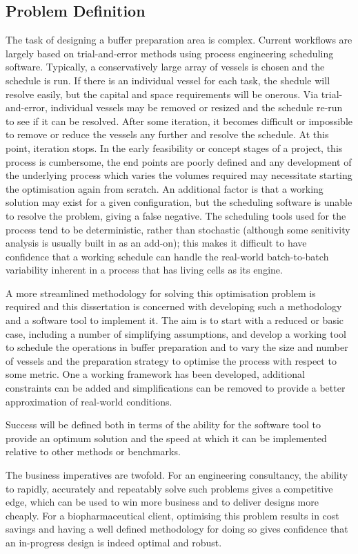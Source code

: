 \subsection{Problem Definition}\label{SS.probdef}

The task of designing a buffer preparation area is complex.  Current workflows
are largely based on trial-and-error methods using process engineering
scheduling software.  Typically, a conservatively large array of vessels is
chosen and the schedule is run.  If there is an individual vessel for each task,
the shedule will resolve easily, but the capital and space requirements will be
onerous.  Via trial-and-error, individual vessels may be removed or resized and
the schedule re-run to see if it can be resolved.  After some iteration, it
becomes difficult or impossible to remove or reduce the vessels any further and 
resolve the schedule.  At this point, iteration stops.  In the early feasibility
or concept stages of a project, this process is cumbersome, the end points are 
poorly defined and any development of the underlying process which varies the 
volumes required may necessitate starting the optimisation again from scratch.
An additional factor is that a working solution may exist for a given
configuration, but the scheduling software is unable to resolve the problem,
giving a false negative. The scheduling tools used for the process tend to be
deterministic, rather than stochastic (although some senitivity analysis is
usually built in as an add-on); this makes it difficult to have confidence that
a working schedule can handle the real-world batch-to-batch variability inherent
in a process that has living cells as its engine.

A more streamlined methodology for solving this optimisation problem is
required and this dissertation is concerned with developing such a methodology
and a software tool to implement it.
The aim is to start with a reduced or basic case, including a number of
simplifying assumptions, and develop a working tool to schedule the operations
in buffer preparation and to vary the size and number of vessels and the 
preparation strategy to optimise the process with respect to some metric.
One a working framework has been developed, additional constraints can be added
and simplifications can be removed to provide a better approximation of 
real-world conditions.

Success will be defined both in terms of the ability for the software tool to
provide an optimum solution and the speed at which it can be implemented
relative to other methods or benchmarks.

The business imperatives are twofold.  For an engineering consultancy, the
ability to rapidly, accurately and repeatably solve such problems gives a
competitive edge, which can be used to win more business and to deliver designs
more cheaply.  For a biopharmaceutical client, optimising this problem results
in cost savings and having a well defined methodology for doing so gives
confidence that an in-progress design is indeed optimal and robust.
